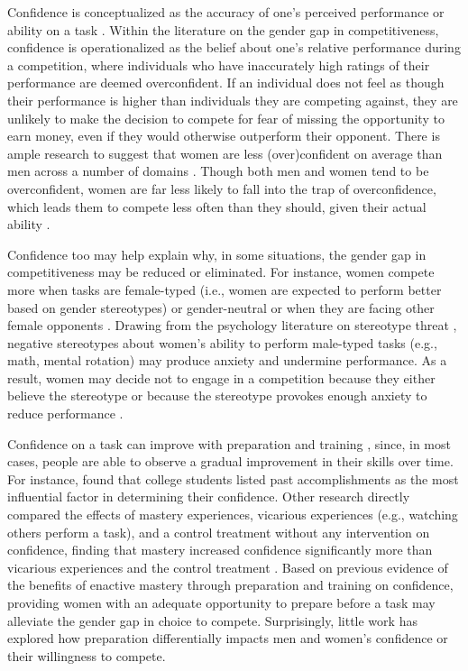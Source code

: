 \documentclass[a4paper, nobind]{templates/ociamthesis}
\begin{document}
Confidence is conceptualized as the accuracy of one's perceived performance or ability on a task \autocite{Beyer1997}. Within the literature on the gender gap in competitiveness, confidence is operationalized as the belief about one's relative performance during a competition, where individuals who have inaccurately high ratings of their performance are deemed overconfident. If an individual does not feel as though their performance is higher than individuals they are competing against, they are unlikely to make the decision to compete for fear of missing the opportunity to earn money, even if they would otherwise outperform their opponent. There is ample research to suggest that women are less (over)confident on average than men across a number of domains \autocite{Mobius2011,Niederle2011,Croson2009,Lundeberg1994,Niederle2007,Bertrand2010a,Beyer1990,Beyer1997}. Though both men and women tend to be overconfident, women are far less likely to fall into the trap of overconfidence, which leads them to compete less often than they should, given their actual ability \autocite{Niederle2007}.

Confidence too may help explain why, in some situations, the gender gap in competitiveness may be reduced or eliminated. For instance, women compete more when tasks are female-typed (i.e., women are expected to perform better based on gender stereotypes) or gender-neutral \autocite{Iriberri2017,Boschini2014,Boschini2019,Apicella2015,Grosse2010,Gunther2010,Dreber2014,Dreber2011,Shurchkov2012} or when they are facing other female opponents \autocite{DattaGupta2013}. Drawing from the psychology literature on stereotype threat \autocite{Steele1997,Spencer1999,Spencer2016}, negative stereotypes about women's ability to perform male-typed tasks (e.g., math, mental rotation) may produce anxiety and undermine performance. As a result, women may decide not to engage in a competition because they either believe the stereotype or because the stereotype provokes enough anxiety to reduce performance \autocite{Gunther2010,Grosse2010,Iriberri2017,Shurchkov2012}.

Confidence on a task can improve with preparation and training \autocite{Gist1992,Schunk1981,Schunk1982,Usher2008}, since, in most cases, people are able to observe a gradual improvement in their skills over time. For instance, \textcite{Lent1996} found that college students listed past accomplishments as the most influential factor in determining their confidence. Other research directly compared the effects of mastery experiences, vicarious experiences (e.g., watching others perform a task), and a control treatment without any intervention on confidence, finding that mastery increased confidence significantly more than vicarious experiences and the control treatment \autocite{Bandura1977a}. Based on previous evidence of the benefits of enactive mastery through preparation and training on confidence, providing women with an adequate opportunity to prepare before a task may alleviate the gender gap in choice to compete. Surprisingly, little work has explored how preparation differentially impacts men and women's confidence or their willingness to compete.
\end{document}
